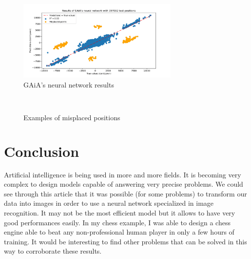 \documentclass[unnumsec,webpdf,contemporary,large]{Article}%
\theoremstyle{thmstyleone}%
\theoremstyle{thmstyletwo}%
\theoremstyle{thmstylethree}%
\begin{document}
\begin{figure}[H]
  \centering
  \includegraphics[width=8cm]{result.png}
  \caption{GAiA's neural network results}
  \label{fig:result}
\end{figure}

\begin{figure}[H]
  \captionsetup[subfigure]{labelformat=empty}
  \centering
  \\
  \caption{Examples of misplaced positions}
  \label{fig:misplaced}
\end{figure}

\section{Conclusion}
Artificial intelligence is being used in more and more fields.
It is becoming very complex to design models capable of answering very precise problems.
We could see through this article that it was possible (for some problems) to transform
our data into images in order to use a neural network specialized in image recognition.
It may not be the most efficient model but it allows to have very good performances easily.
In my chess example, I was able to design a chess engine able to beat any non-professional
human player in only a few hours of training. It would be interesting to find other problems
that can be solved in this way to corroborate these results.




\end{document}
